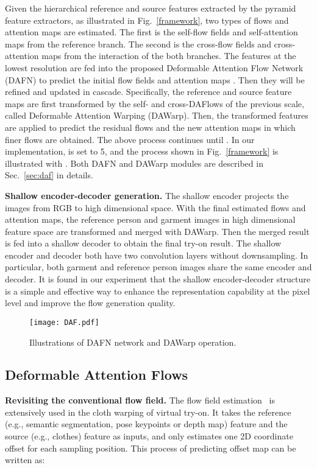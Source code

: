 \documentclass[runningheads]{llncs}
\begin{document}
Given the hierarchical reference and source features  extracted by the pyramid feature extractors, as illustrated in Fig.~\ref{framework}, two types of flows and attention maps are estimated. The first is the self-flow fields and self-attention maps  from the reference branch. The second is the cross-flow fields and cross-attention maps  from the interaction of the both branches.
The features  at the lowest resolution are fed into the proposed Deformable Attention Flow Network (DAFN) to predict the initial flow fields  and attention maps . Then they will be refined and updated in cascade. Specifically, the reference and source feature maps  are first transformed 
by the self- and cross-DAFlows   of the previous scale, called Deformable Attention Warping (DAWarp). Then, the transformed features  are applied to predict the residual flows and the new attention maps in which finer flows are obtained. The above process continues until . In our implementation,  is set to 5, and the process shown in Fig.~\ref{framework} is illustrated with . Both DAFN and DAWarp modules are described in Sec.~\ref{sec:daf} in details.

\textbf{Shallow encoder-decoder generation.} The shallow encoder projects the images from RGB to high dimensional space. With the final estimated flows and attention maps, the reference person and garment images in high dimensional feature space are transformed and merged with DAWarp. Then the merged result is fed into a shallow decoder to obtain the final try-on result. The shallow encoder and decoder both have two convolution layers without downsampling. In particular, both garment and reference person images share the same encoder and decoder. It is found in our experiment that the shallow encoder-decoder structure is a simple and effective way to enhance the representation capability at the pixel level and improve the flow generation quality.



\begin{figure}[t]
\centering
\texttt{[image: DAF.pdf]}
   \caption{Illustrations of DAFN network and DAWarp operation.
   \label{DAF}}

\end{figure}


\subsection{Deformable Attention Flows\label{sec:daf}}

\textbf{Revisiting the conventional flow field.} 
The flow field estimation~\cite{han2019clothflow,zflow,ge2021parser} is extensively used in the cloth warping of virtual try-on.  It takes the reference (e.g., semantic segmentation, pose keypoints or depth map) feature  and the source (e.g., clothes) feature  as inputs, and only estimates one 2D coordinate offset for each sampling position. This process of predicting offset map  can be written as:
\end{document}

